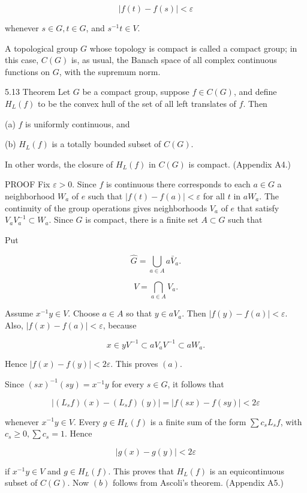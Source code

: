 \documentclass[10pt]{article}
\begin{document}
$$
|f(t)-f(s)|<\varepsilon
$$

whenever $s \in G, t \in G$, and $s^{-1} t \in V$.

A topological group $G$ whose topology is compact is called a compact group; in this case, $C(G)$ is, as usual, the Banach space of all complex continuous functions on $G$, with the supremum norm.

5.13 Theorem Let $G$ be a compact group, suppose $f \in C(G)$, and define $H_{L}(f)$ to be the convex hull of the set of all left translates of $f$. Then

(a) $f$ is uniformly continuous, and

(b) $H_{L}(f)$ is a totally bounded subset of $C(G)$.

In other words, the closure of $H_{L}(f)$ in $C(G)$ is compact. (Appendix A4.)

PROOF Fix $\varepsilon>0$. Since $f$ is continuous there corresponds to each $a \in G$ a neighborhood $W_{a}$ of $e$ such that $|f(t)-f(a)|<\varepsilon$ for all $t$ in $a W_{a}$. The continuity of the group operations gives neighborhoods $V_{a}$ of $e$ that satisfy $V_{a} V_{a}^{-1} \subset W_{a}$. Since $G$ is compact, there is a finite set $A \subset G$ such that

Put

$$
\widehat{G}=\bigcup_{a \in A} a \bar{V}_{a} .
$$

$$
V=\bigcap_{a \in A} V_{a} .
$$

Assume $x^{-1} y \in V$. Choose $a \in A$ so that $y \in a V_{a}$. Then $|f(y)-f(a)|<\varepsilon$. Also, $|f(x)-f(a)|<\varepsilon$, because

$$
x \in y V^{-1} \subset a V_{a} V^{-1} \subset a W_{a} .
$$

Hence $|f(x)-f(y)|<2 \varepsilon$. This proves $(a)$.

Since $(s x)^{-1}(s y)=x^{-1} y$ for every $s \in G$, it follows that

$$
\left|\left(L_{s} f\right)(x)-\left(L_{s} f\right)(y)\right|=|f(s x)-f(s y)|<2 \varepsilon
$$

whenever $x^{-1} y \in V$. Every $g \in H_{L}(f)$ is a finite sum of the form $\sum c_{s} L_{s} f$, with $c_{s} \geq 0, \sum c_{s}=1$. Hence

$$
|g(x)-g(y)|<2 \varepsilon
$$

if $x^{-1} y \in V$ and $g \in H_{L}(f)$. This proves that $H_{L}(f)$ is an equicontinuous subset of $C(G)$. Now $(b)$ follows from Ascoli's theorem. (Appendix A5.)
\end{document}
